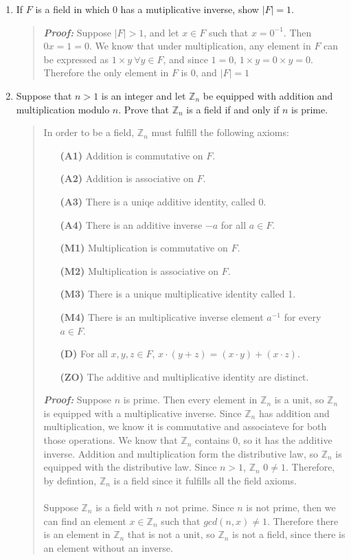 \documentclass{article}
\newcommand{\ZZ}{\mathbb{Z}}
\begin{document}
\begin{enumerate}
\item If $F$ is a field in which 0 has a mutiplicative inverse, show $|F|=1$.
\begin{quote}
\textbf{\textit{Proof:}} Suppose $|F|>1$, and let $x\in F$ such that $x=0^{-1}$. Then $0x=1=0$. We know that under multiplication, any element in $F$ can be expressed as $1\times y\ \forall y\in F$, and since $1=0$, $1\times y = 0 \times y = 0$. Therefore the only element in $F$ is 0, and $|F|=1$
\end{quote}

\item Suppose that $n>1$ is an integer and let $\ZZ_{n}$ be equipped with addition and multiplication modulo $n$. Prove that $\ZZ_{n}$ is a field if and only if $n$ is prime.
\begin{quote}
In order to be a field, $\ZZ_{n}$ must fulfill the following axioms:
\begin{enumerate}
\item[\textbf{(A1)}] Addition is commutative on $F$.
\item[\textbf{(A2)}] Addition is associative on $F$.
\item[\textbf{(A3)}] There is a uniqe additive identity, called 0.
\item[\textbf{(A4)}] There is an additive inverse $-a$ for all $a\in F$.
\item[\textbf{(M1)}] Multiplication is commutative on $F$.
\item[\textbf{(M2)}] Multiplication is associative on $F$.
\item[\textbf{(M3)}] There is a unique multiplicative identity called 1.
\item[\textbf{(M4)}] There is an multiplicative inverse element $a^{-1}$ for every $a\in F$.
\item[\textbf{(D)}] For all $x,y,z\in F$, $x\cdot(y+z)=(x\cdot y)+(x\cdot z)$.
\item[\textbf{(ZO)}] The additive and multiplicative identity are distinct.
\end{enumerate}

\textbf{\textit{Proof:}} Suppose $n$ is prime. Then every element in $\ZZ_{n}$ is a unit, so $\ZZ_{n}$ is equipped with a multiplicative inverse. Since $\ZZ_{n}$ has addition and multiplication, we know it is commutative and associateve for both those operations. We know that $\ZZ_{n}$ contains 0, so it has the additive inverse. Addition and multiplication form the distributive law, so $\ZZ_{n}$ is equipped with the distributive law. Since $n>1$, $\ZZ_{n}$ $0\neq1$. Therefore, by defintion, $\ZZ_{n}$ is a field since it fulfills all the field axioms.\\\\
Suppose $\ZZ_{n}$ is a field with $n$ not prime. Since $n$ is not prime, then we can find an element $x\in\ZZ_{n}$ such that $gcd(n,x)\neq1$. Therefore there is an element in $\ZZ_{n}$ that is not a unit, so $\ZZ_{n}$ is not a field, since there is an element without an inverse.
\end{quote}


\end{enumerate}
\end{document}
